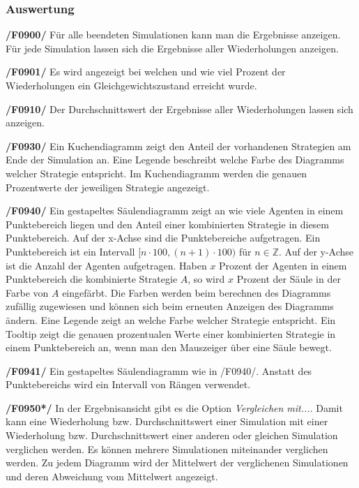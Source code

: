 \subsubsection{Auswertung}

\textbf{/F0900/}
Für alle beendeten Simulationen kann man die Ergebnisse anzeigen. Für jede Simulation lassen sich die Ergebnisse aller Wiederholungen anzeigen.

\textbf{/F0901/}
Es wird angezeigt bei welchen und wie viel Prozent der Wiederholungen ein Gleichgewichtszustand erreicht wurde.


\textbf{/F0910/}
Der Durchschnittswert der Ergebnisse aller Wiederholungen lassen sich anzeigen.

\textbf{/F0930/}
Ein Kuchendiagramm zeigt den Anteil der vorhandenen Strategien am Ende der Simulation an. Eine Legende beschreibt welche Farbe des Diagramms welcher Strategie entspricht. Im Kuchendiagramm werden die genauen Prozentwerte der jeweiligen Strategie angezeigt.

\textbf{/F0940/}
Ein gestapeltes Säulendiagramm zeigt an wie viele Agenten in einem Punktebereich liegen und den Anteil einer kombinierten Strategie in diesem Punktebereich. Auf der x-Achse sind die Punktebereiche aufgetragen. Ein Punktebereich ist ein Intervall $[n \cdot 100, (n+1) \cdot 100)$ für $n \in \mathbb{Z}$. Auf der y-Achse ist die Anzahl der Agenten aufgetragen. Haben $x$ Prozent der Agenten in einem Punktebereich die kombinierte Strategie $A$, so wird $x$ Prozent der Säule in der Farbe von $A$ eingefärbt. Die Farben werden beim berechnen des Diagramms zufällig zugewiesen und können sich beim erneuten Anzeigen des Diagramms ändern. Eine Legende zeigt an welche Farbe welcher Strategie entspricht. Ein Tooltip zeigt die genauen prozentualen Werte einer kombinierten Strategie in einem Punktebereich an, wenn man den Mauszeiger über eine Säule bewegt.

\textbf{/F0941/}
Ein gestapeltes Säulendiagramm wie in /F0940/. Anstatt des Punktebereichs wird ein Intervall von Rängen verwendet.

\textbf{/F0950*/}
In der Ergebnisansicht gibt es die Option \emph{Vergleichen mit...}. Damit kann eine Wiederholung bzw. Durchschnittswert einer Simulation mit einer Wiederholung bzw. Durchschnittswert einer anderen oder gleichen Simulation verglichen werden. Es können mehrere Simulationen miteinander verglichen werden. Zu jedem Diagramm wird der Mittelwert der verglichenen Simulationen und deren Abweichung vom Mittelwert angezeigt.

